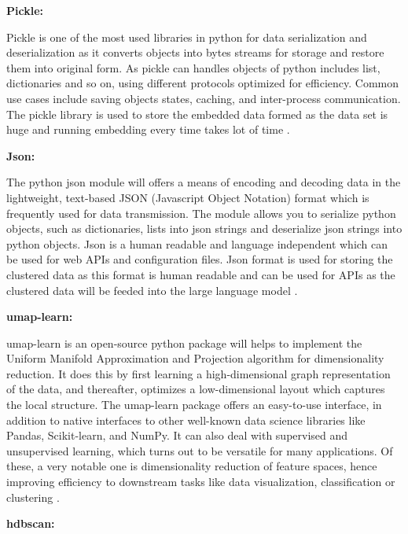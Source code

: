 \noindent\textbf{Pickle:}

 Pickle is one of the most used libraries in python for data serialization and deserialization as it converts objects 
 into bytes streams for storage and restore them into original form. As pickle can handles objects of python includes 
 list, dictionaries and so on, using different protocols optimized for efficiency. Common use cases include saving 
 objects states, caching, and inter-process communication. The pickle library is used to store the embedded data 
 formed as the data set is huge and running embedding every time takes lot of time \cite{pythonlibrary}.

\noindent\textbf{Json:}

The python json module will offers a means of encoding and decoding data in the lightweight, text-based JSON (Javascript Object Notation)
format which is frequently used for data transmission. The module allows you to serialize python objects, 
such as dictionaries, lists into json strings and deserialize json strings into python objects. Json is a human readable 
and language independent which can be used for web APIs and configuration files. Json format is used for storing the 
clustered data as this format is human readable and can be used for APIs as the clustered data will be feeded into the 
large language model \cite{pythonlibrary}.

\noindent\textbf{umap-learn:}

umap-learn is an open-source python package will helps to implement the Uniform Manifold Approximation and Projection 
algorithm for dimensionality reduction. It does this by first learning a high-dimensional graph representation of 
the data, and thereafter, optimizes a low-dimensional layout which captures the local structure. 
The umap-learn package offers an easy-to-use interface, in addition to native interfaces to other 
well-known data science libraries like Pandas, Scikit-learn, and NumPy. It can also deal with supervised and 
unsupervised learning, which turns out to be versatile for many applications. Of these, a very notable one is 
dimensionality reduction of feature spaces, hence improving efficiency to downstream tasks like data visualization, 
classification or clustering \cite{pythonlibrary}. 
\vspace{2cm}

\noindent\textbf{hdbscan:}

